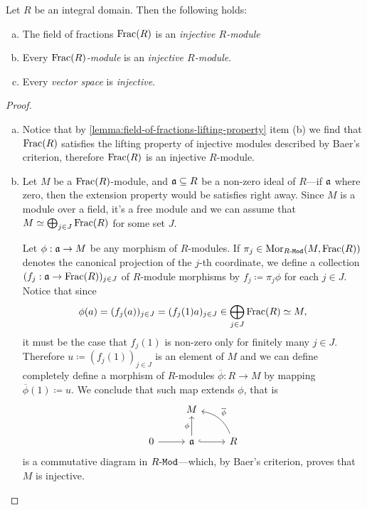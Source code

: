 \begin{corollary}
    \label{cor:field-of-fractions-injective}
    Let \(R\) be an integral domain. Then the following holds:
    \begin{enumerate}[(a)]\setlength\itemsep{0em}
        \item The field of fractions \(\operatorname{Frac}(R)\) is an \emph{injective \(R\)-module}

        \item Every \emph{\(\operatorname{Frac}(R)\)-module} is an \emph{injective \(R\)-module}.

        \item Every \emph{vector space} is \emph{injective}.
    \end{enumerate}
\end{corollary}

\begin{proof}
    \begin{enumerate}[(a)]\setlength\itemsep{0em}
        \item Notice that by \cref{lemma:field-of-fractions-lifting-property} item (b)
              we find that \(\operatorname{Frac}(R)\) satisfies the lifting property of injective modules
              described by Baer's criterion, therefore \(\operatorname{Frac}(R)\) is an injective
              \(R\)-module.

        \item Let \(M\) be a \(\operatorname{Frac}(R)\)-module, and \(\mathfrak{a} \subseteq R\) be a
              non-zero ideal of \(R\)---if \(\mathfrak{a}\) where zero, then the extension
              property would be satisfies right away. Since \(M\) is a module over a field,
              it's a free module and we can assume that
              \(M \simeq \bigoplus_{j \in J} \operatorname{Frac}(R)\) for some set \(J\).

              Let \(\phi: \mathfrak{a} \to M\) be any morphism of \(R\)-modules. If
              \(\pi_j \in \operatorname{Mor}_{{R\text{-}\texttt{Mod}}}(M, \operatorname{Frac}(R))\) denotes the canonical projection of
              the \(j\)-th coordinate, we define a collection
              \((f_j: \mathfrak{a} \to \operatorname{Frac}(R))_{j \in J}\) of \(R\)-module morphisms by
              \(f_j \coloneq \pi_j \phi\) for each \(j \in J\). Notice that since
              \[
                  \phi(a) = (f_j(a))_{j \in J} = (f_j(1) a)_{j \in J}
                  \in \bigoplus_{j \in J} \operatorname{Frac}(R) \simeq M,
              \]
              it must be the case that \(f_j(1)\) is non-zero only for finitely many
              \(j \in J\). Therefore \(u \coloneq (f_j(1))_{j \in J}\) is an element of
              \(M\) and we can define completely define a morphism of \(R\)-modules
              \(\overline{\phi}: R \to M\) by mapping \(\overline{\phi}(1) \coloneq u\). We
              conclude that such map extends \(\phi\), that is
              \[
                  \begin{tikzcd}
                      &M & \\
                      0 \ar[r] &\ideal a \ar[r, hook] \ar[u, "\phi"]
                      &R \ar[lu, bend right, "\overline{\phi}"']
                  \end{tikzcd}
              \]
              is a commutative diagram in \({R\text{-}\texttt{Mod}}\)---which, by Baer's criterion, proves
              that \(M\) is injective.


\end{enumerate}
\end{proof}
